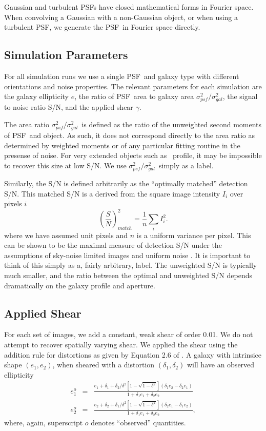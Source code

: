 \documentclass[12pt,preprint]{aastex}
\newcommand{\aratio}{\ensuremath{\sigma^2_{psf}/\sigma^2_{gal}}}
\newcommand{\psf}{PSF}
\begin{document}
Gaussian and turbulent \psf s have closed mathematical forms in Fourier space.
When convolving a Gaussian with a non-Gaussian object, or when using a
turbulent \psf, we generate the \psf\ in Fourier space directly.

\subsection{Simulation Parameters}

For all simulation runs we use a single \psf\ and galaxy type with different
orientations and noise properties.  The relevant parameters for each simulation
are the galaxy ellipticity $e$, the ratio of \psf\ area to galaxy area \aratio,
the signal to noise ratio S/N, and the applied shear $\gamma$.

The area ratio \aratio\ is defined as the ratio of the unweighted second
moments of \psf\ and object.  As such, it does not correspond directly to the
area ratio as determined by weighted moments or of any particular fitting
routine in the presense of noise.  For very extended objects such as \devauc\
profile, it may be impossible to recover this size at low S/N.  We use \aratio\
simply as a label.

Similarly, the S/N is defined arbitrarily as the ``optimally matched''
detection S/N.  This matched S/N is a derived from the square image intensity
$I_i$ over pixels $i$
\begin{equation}
\left(\frac{S}{N}\right)^2_{match} = \frac{1}{n} \sum_{i} I_i^2.
\end{equation}
where we have assumed unit pixels and $n$ is a uniform variance per pixel.
This can be shown to be the maximal measure of detection S/N under the
assumptions of sky-noise limited images and uniform noise \citep{plazasthesis}.
It is important to think of this simply as a, fairly arbitrary, label.  The
unweighted S/N is typically much smaller, and the ratio between the optimal and
unweighted S/N depends dramatically on the galaxy profile and aperture.

\subsection{Applied Shear} \label{sec:sim:shear}

For each set of images, we add a constant, weak shear of order 0.01.  We do not
attempt to recover spatially varying shear.  We applied the shear using the
addition rule for distortions as given by Equation 2.6 of
\citet{Escude91}. A galaxy with intrinsice shape $(e_1,e_2)$, when
sheared with a distortion $(\delta_1, \delta_2)$ will have an observed
ellipticity
\begin{eqnarray}
e_1^o  & = & \frac
{e_1 + \delta_1 + \delta_2/\delta^2\left[1 - \sqrt{1-\delta^2}\right]\left( \delta_1 e_2 - \delta_2 e_1\right)}
{1 + \delta_1 e_1 + \delta_2 e_2 } \\
e_2^o  & = & \frac
{e_2 + \delta_2 + \delta_1/\delta^2\left[1 - \sqrt{1-\delta^2}\right]\left( \delta_2 e_1 - \delta_1 e_2\right)}
{1 + \delta_1 e_1 + \delta_2 e_2 },
\end{eqnarray}
where, again, superscript $o$ denotes ``observed'' quantities.
\end{document}
